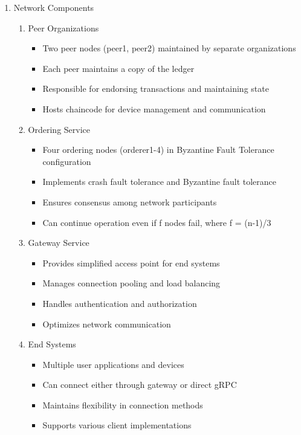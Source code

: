 \documentclass[conference]{IEEEtran}
\begin{document}
\begin{enumerate}[itemsep=2ex, parsep=1ex]
	\item{Network Components}
			
	\begin{enumerate}
		\item Peer Organizations
		      \begin{itemize}[itemsep=0.5pt, parsep=0.5pt]
		      	\item Two peer nodes (peer1, peer2) maintained by separate organizations
		      	\item Each peer maintains a copy of the ledger
		      	\item Responsible for endorsing transactions and maintaining state
		      	\item Hosts chaincode for device management and communication
		      \end{itemize}
		      		      		      
		\item Ordering Service
		      \begin{itemize}[itemsep=0.5pt, parsep=0.5pt]
		      	\item Four ordering nodes (orderer1-4) in Byzantine Fault Tolerance configuration
		      	\item Implements crash fault tolerance and Byzantine fault tolerance
		      	\item Ensures consensus among network participants
		      	\item Can continue operation even if f nodes fail, where f = (n-1)/3
		      \end{itemize}
		      		      		      
		\item Gateway Service
		      \begin{itemize}[itemsep=0.5pt, parsep=0.5pt]
		      	\item Provides simplified access point for end systems
		      	\item Manages connection pooling and load balancing
		      	\item Handles authentication and authorization
		      	\item Optimizes network communication
		      \end{itemize}
		      		      		      
		\item End Systems
		      \begin{itemize}[itemsep=0.5pt, parsep=0.5pt]
		      	\item Multiple user applications and devices
		      	\item Can connect either through gateway or direct gRPC
		      	\item Maintains flexibility in connection methods
		      	\item Supports various client implementations
		      \end{itemize}
	\end{enumerate}
			

\end{enumerate}
\end{document}
